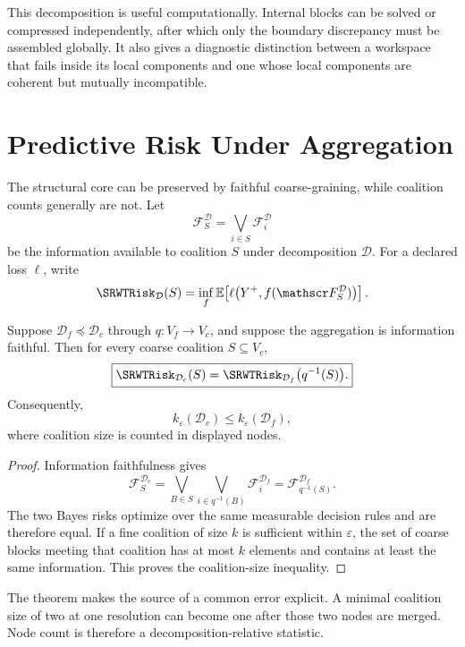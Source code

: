 This decomposition is useful computationally. Internal blocks can be solved
or compressed independently, after which only the boundary discrepancy must
be assembled globally. It also gives a diagnostic distinction between a
workspace that fails inside its local components and one whose local
components are coherent but mutually incompatible.

\section{Predictive Risk Under Aggregation}

The structural core can be preserved by faithful coarse-graining, while
coalition counts generally are not. Let
\[
\mathscr F_S^{\mathcal D}
=
\bigvee_{i\in S}\mathscr F_i^{\mathcal D}
\]
be the information available to coalition \(S\) under decomposition
\(\mathcal D\). For a declared loss \(\ell\), write
\[
\SRWTRisk_{\mathcal D}(S)
=
\inf_f
\mathbb E\!\left[
\ell\bigl(Y^+,f(\mathscr F_S^{\mathcal D})\bigr)
\right].
\]

\begin{SRWTtheorem}
\label{SRWT:thm:risk-aggregation}
Suppose \(\mathcal D_f\preceq\mathcal D_c\) through
\(q:V_f\to V_c\), and suppose the aggregation is information faithful. Then
for every coarse coalition \(S\subseteq V_c\),
\[
\boxed{
\SRWTRisk_{\mathcal D_c}(S)
=
\SRWTRisk_{\mathcal D_f}\bigl(q^{-1}(S)\bigr).
}
\]
Consequently,
\[
k_\varepsilon(\mathcal D_c)
\leq
k_\varepsilon(\mathcal D_f),
\]
where coalition size is counted in displayed nodes.
\end{SRWTtheorem}

\begin{proof}
Information faithfulness gives
\[
\mathscr F_S^{\mathcal D_c}
=
\bigvee_{B\in S}
\bigvee_{i\in q^{-1}(B)}
\mathscr F_i^{\mathcal D_f}
=
\mathscr F_{q^{-1}(S)}^{\mathcal D_f}.
\]
The two Bayes risks optimize over the same measurable decision rules and are
therefore equal. If a fine coalition of size \(k\) is sufficient within
\(\varepsilon\), the set of coarse blocks meeting that coalition has at most
\(k\) elements and contains at least the same information. This proves the
coalition-size inequality.
\end{proof}

The theorem makes the source of a common error explicit. A minimal coalition
size of two at one resolution can become one after those two nodes are merged.
Node count is therefore a decomposition-relative statistic.

